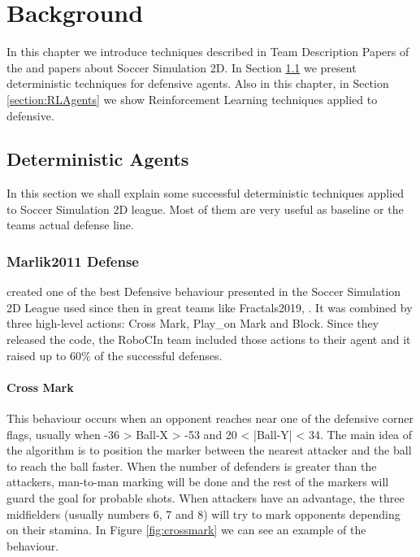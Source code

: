 \chapter{Background}\label{chapter:background}
In this chapter we introduce techniques described in Team Description Papers of the \cite{robocup} and papers about Soccer Simulation 2D. In Section \ref{section:DefensiveDeterministic} we present deterministic techniques for defensive agents. Also in this chapter, in Section \ref{section:RLAgents} we show Reinforcement Learning techniques applied to defensive.

\section{Deterministic Agents}\label{section:DefensiveDeterministic}
In this section we shall explain some successful deterministic techniques applied to Soccer Simulation 2D league. Most of them are very useful as baseline or the teams actual defense line.

\subsection{Marlik2011 Defense}
\cite{marlik2011} created one of the best Defensive behaviour presented in the Soccer Simulation 2D League used since then in great teams like Fractals2019, \cite{glidersv2}. It was combined by three high-level actions: Cross Mark, Play\_on Mark and Block. Since they released the code, the RoboCIn team included those actions to their agent and it raised up to 60\% of the successful defenses.

\subsubsection{Cross Mark}
This behaviour occurs when an opponent reaches near one of the defensive corner flags, usually when -36 > Ball-X > -53 and 20 < |Ball-Y| < 34. The main idea of the algorithm is to position the marker between the nearest attacker and the ball to reach the ball faster. When the number of defenders is greater than the attackers, man-to-man marking will be done and the rest of the markers will guard the goal for probable shots. When attackers have an advantage, the three midfielders (usually numbers 6, 7 and 8) will try to mark opponents depending on their stamina. In Figure \ref{fig:crossmark} we can see an example of the behaviour.

